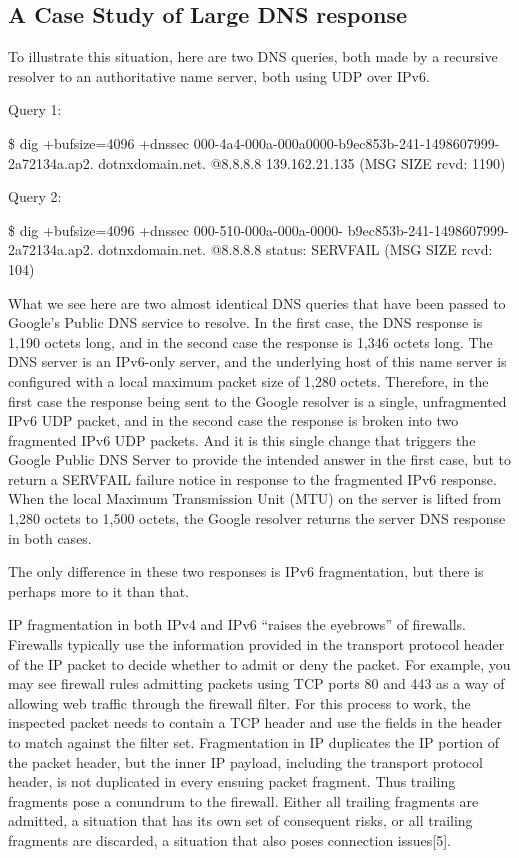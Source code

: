 \subsection{A Case Study of Large DNS response}


To illustrate this situation, here are two DNS queries, 
both made by a recursive resolver to an authoritative 
name server, both using UDP over IPv6.

Query 1:

\$ dig +bufsize=4096 +dnssec 000-4a4-000a-000a0000-b9ec853b-241-1498607999-2a72134a.ap2.
dotnxdomain.net. @8.8.8.8
139.162.21.135
(MSG SIZE rcvd: 1190)

Query 2:

\$ dig +bufsize=4096 +dnssec 000-510-000a-000a-0000-
b9ec853b-241-1498607999-2a72134a.ap2.
dotnxdomain.net. @8.8.8.8
status: SERVFAIL
(MSG SIZE rcvd: 104)

What we see here are two almost identical DNS queries that have
been passed to Google’s Public DNS service to resolve.
In the first case, the DNS response is 1,190 octets long, and in the
second case the response is 1,346 octets long. The DNS server is an
IPv6-only server, and the underlying host of this name server is configured
with a local maximum packet size of 1,280 octets. Therefore,
in the first case the response being sent to the Google resolver is a
single, unfragmented IPv6 UDP packet, and in the second case the
response is broken into two fragmented IPv6 UDP packets. And it is
this single change that triggers the Google Public DNS Server to provide
the intended answer in the first case, but to return a SERVFAIL
failure notice in response to the fragmented IPv6 response. When the
local Maximum Transmission Unit (MTU) on the server is lifted from
1,280 octets to 1,500 octets, the Google resolver returns the server
DNS response in both cases. 

The only difference in these two responses is IPv6 fragmentation, but
there is perhaps more to it than that.

IP fragmentation in both IPv4 and IPv6 “raises the eyebrows” of
firewalls. Firewalls typically use the information provided in the
transport protocol header of the IP packet to decide whether to admit
or deny the packet. For example, you may see firewall rules admitting
packets using TCP ports 80 and 443 as a way of allowing web traffic
through the firewall filter. For this process to work, the inspected
packet needs to contain a TCP header and use the fields in the header
to match against the filter set. Fragmentation in IP duplicates the IP
portion of the packet header, but the inner IP payload, including the
transport protocol header, is not duplicated in every ensuing packet
fragment. Thus trailing fragments pose a conundrum to the firewall.
Either all trailing fragments are admitted, a situation that has its own
set of consequent risks, or all trailing fragments are discarded, a situation
that also poses connection issues[5].

